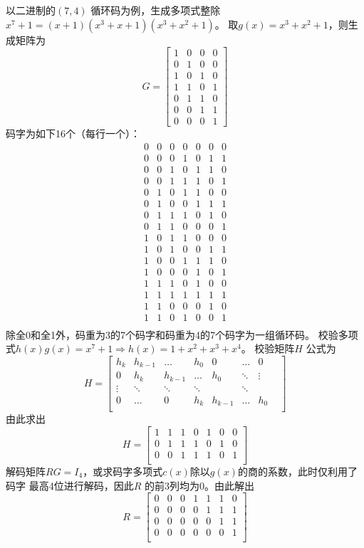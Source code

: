 \documentclass{article}
\begin{document}
以二进制的$(7,4)$ 循环码为例，生成多项式整除$x^7 + 1 = (x+1)(x^3+x+1)(x^3+x^2+1)$。
取$g(x) = x^3 + x^2 + 1$，则生成矩阵为
$$
G = \begin{bmatrix}
1 & 0 & 0 & 0 \\
0 & 1 & 0 & 0 \\
1 & 0 & 1 & 0 \\
1 & 1 & 0 & 1 \\
0 & 1 & 1 & 0 \\
0 & 0 & 1 & 1 \\
0 & 0 & 0 & 1
\end{bmatrix}
$$
码字为如下16个（每行一个）：
$$
\begin{array}{ccccccc}
0&0&0&0&0&0&0\\
0&0&0&1&0&1&1\\
0&0&1&0&1&1&0\\
0&0&1&1&1&0&1\\
0&1&0&1&1&0&0\\
0&1&0&0&1&1&1\\
0&1&1&1&0&1&0\\
0&1&1&0&0&0&1\\
1&0&1&1&0&0&0\\
1&0&1&0&0&1&1\\
1&0&0&1&1&1&0\\
1&0&0&0&1&0&1\\
1&1&1&0&1&0&0\\
1&1&1&1&1&1&1\\
1&1&0&0&0&1&0\\
1&1&0&1&0&0&1\\
\end{array}
$$
除全0和全1外，码重为3的7个码字和码重为4的7个码字为一组循环码。
校验多项式$h(x)g(x) = x^7 + 1 \Rightarrow h(x) = 1 + x^2 + x^3 + x^4 $。
校验矩阵$H$ 公式为
$$
H = \begin{bmatrix}
h_k & h_{k-1} & \dots & h_0 & 0 & \dots & 0 \\
0 & h_k & h_{k-1} & \dots & h_0 & \ddots & \vdots \\
\vdots & \ddots & \ddots & \ddots & & \ddots & & \\
0 & \dots & 0 & h_k & h_{k-1} & \dots & h_0 \\
\end{bmatrix}
$$
由此求出 
$$
H = \begin{bmatrix}
1 & 1 & 1 & 0 & 1 & 0  & 0 \\
0 & 1 & 1 & 1 & 0 & 1 & 0 \\
0 & 0 & 1 & 1 & 1 & 0 & 1 \\
\end{bmatrix}
$$
解码矩阵$RG=I_4 $，或求码字多项式$c(x)$除以$g(x)$的商的系数，此时仅利用了码字
最高4位进行解码，因此$R$ 的前3列均为0。由此解出 
$$ 
R = 
\begin{bmatrix}
0 & 0 & 0 & 1 & 1 & 1 & 0 \\
0 & 0 & 0 & 0 & 1 & 1 & 1 \\
0 & 0 & 0 & 0 & 0 & 1 & 1 \\
0 & 0 & 0 & 0 & 0 & 0 & 1 \\
\end{bmatrix}
$$
\end{document}
